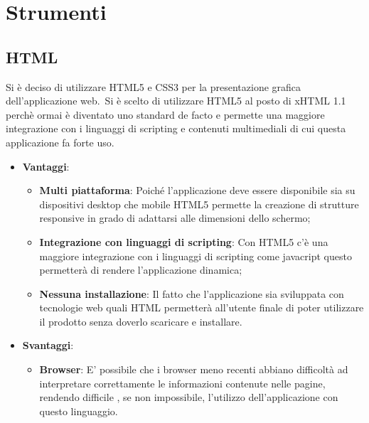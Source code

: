\section{Strumenti}
\subsection{HTML}
Si è deciso di utilizzare HTML5 e CSS3 per la presentazione grafica dell'applicazione web.\
Si è scelto di utilizzare HTML5 al posto di xHTML 1.1 perchè ormai è diventato uno standard de facto e permette una maggiore integrazione con i linguaggi di scripting e contenuti multimediali
di cui questa applicazione fa forte uso.

\begin{itemize}
\item \textbf{Vantaggi}: 
\begin{itemize}
\item \textbf{Multi piattaforma}: Poiché l'applicazione deve essere disponibile sia su dispositivi desktop che mobile HTML5 permette la creazione di strutture responsive in grado di adattarsi alle dimensioni dello schermo;
\item \textbf{Integrazione con linguaggi di scripting}: Con HTML5 c'è una maggiore integrazione con i linguaggi di scripting come javacript questo permetterà di rendere l'applicazione dinamica;
\item \textbf{Nessuna installazione}: Il fatto che l'applicazione sia sviluppata con tecnologie web quali HTML permetterà all'utente finale di poter utilizzare il prodotto senza doverlo scaricare e installare.
\end{itemize}
\item \textbf{Svantaggi}:
\begin{itemize}


\item \textbf{Browser}: E' possibile che i browser meno recenti abbiano difficoltà ad interpretare correttamente le informazioni contenute nelle pagine, rendendo difficile , se non impossibile, l'utilizzo dell'applicazione con questo linguaggio.
\end{itemize}
\end{itemize}
